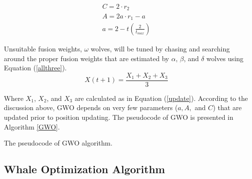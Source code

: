\begin{equation}
	\label{parameters}
	\begin{aligned}
		C = 2 \cdot r_2      \\
		A = 2a \cdot r_1 - a \\
		a = 2 - t(\frac{2}{t_{max}})
	\end{aligned}
\end{equation}

Unsuitable fusion weights, $\omega$ wolves, will be tuned by chasing and searching around the proper fusion weights that are estimated by $\alpha$, $\beta$, and $\delta$ wolves using Equation (\ref{allthree}).
\begin{equation}
	\label{allthree}
	X(t+1)=\frac{X_1+X_2+X_3}{3}
\end{equation}

\noindent Where $X_1$, $X_2$, and  $X_3 $ are calculated as in Equation (\ref{update}). According to the discussion above, GWO depends on very few parameters ($a, A,$ and $C$) that are updated prior to position updating. The pseudocode of GWO  is presented in Algorithm \ref{GWO}.



\begin{algorithm}[!ht]
	\caption{The pseudocode of GWO algorithm. \label{GWO}}


\end{algorithm}




\subsection{Whale Optimization Algorithm } \label{Sec:4_3_5-WOA}

